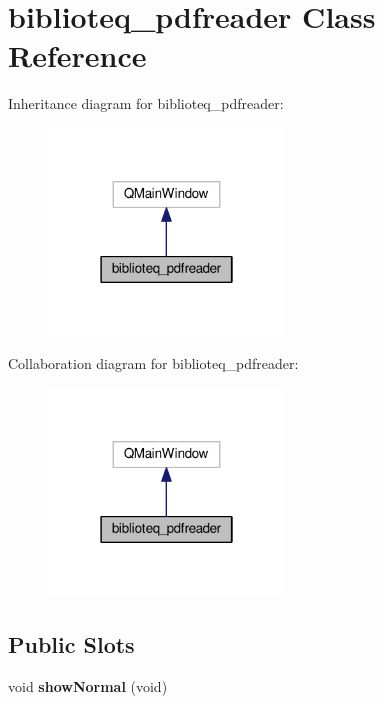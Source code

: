 \hypertarget{classbiblioteq__pdfreader}{}\section{biblioteq\+\_\+pdfreader Class Reference}
\label{classbiblioteq__pdfreader}


Inheritance diagram for biblioteq\+\_\+pdfreader\+:
\nopagebreak
\begin{figure}[H]
\begin{center}
\leavevmode
\includegraphics[width=178pt]{classbiblioteq__pdfreader__inherit__graph}
\end{center}
\end{figure}


Collaboration diagram for biblioteq\+\_\+pdfreader\+:
\nopagebreak
\begin{figure}[H]
\begin{center}
\leavevmode
\includegraphics[width=178pt]{classbiblioteq__pdfreader__coll__graph}
\end{center}
\end{figure}
\subsection*{Public Slots}
\begin{DoxyCompactItemize}
\item 
void {\bfseries show\+Normal} (void)\hypertarget{classbiblioteq__pdfreader_ab57800b6bcf4921d5b8acc3d0ab5b6fc}{}\label{classbiblioteq__pdfreader_ab57800b6bcf4921d5b8acc3d0ab5b6fc}

\end{DoxyCompactItemize}
